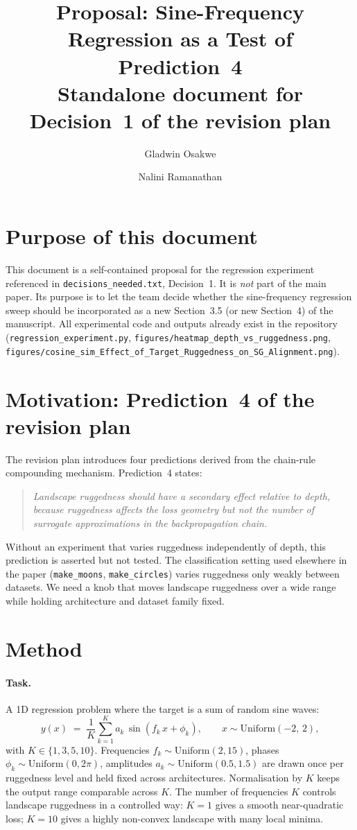 \documentclass[11pt]{article}
\title{Proposal: Sine-Frequency Regression as a Test of Prediction~4\\
{\large Standalone document for Decision~1 of the revision plan}}
\author{Gladwin Osakwe \and Nalini Ramanathan}
\date{}
\begin{document}
\maketitle

\section*{Purpose of this document}
This document is a self-contained proposal for the regression experiment
referenced in \texttt{decisions\_needed.txt}, Decision~1. It is \emph{not}
part of the main paper. Its purpose is to let the team decide whether the
sine-frequency regression sweep should be incorporated as a new
Section~3.5 (or new Section~4) of the manuscript. All experimental code
and outputs already exist in the repository
(\texttt{regression\_experiment.py},
\texttt{figures/heatmap\_depth\_vs\_ruggedness.png},
\texttt{figures/cosine\_sim\_Effect\_of\_Target\_Ruggedness\_on\_SG\_Alignment.png}).

\section{Motivation: Prediction~4 of the revision plan}
The revision plan introduces four predictions derived from the chain-rule
compounding mechanism. Prediction~4 states:
\begin{quote}
\itshape
Landscape ruggedness should have a secondary effect relative to depth,
because ruggedness affects the loss geometry but not the number of
surrogate approximations in the backpropagation chain.
\end{quote}
Without an experiment that varies ruggedness independently of depth, this
prediction is asserted but not tested. The classification setting used
elsewhere in the paper (\texttt{make\_moons}, \texttt{make\_circles})
varies ruggedness only weakly between datasets. We need a knob that
moves landscape ruggedness over a wide range while holding architecture
and dataset family fixed.

\section{Method}
\paragraph{Task.} A 1D regression problem where the target is a sum of
random sine waves:
\[
y(x) \;=\; \frac{1}{K}\sum_{k=1}^{K} a_k\,\sin(f_k\,x + \phi_k),\qquad
x \sim \mathrm{Uniform}(-2,\,2),
\]
with $K \in \{1,3,5,10\}$. Frequencies $f_k\sim\mathrm{Uniform}(2,15)$,
phases $\phi_k\sim\mathrm{Uniform}(0,2\pi)$, amplitudes
$a_k\sim\mathrm{Uniform}(0.5,1.5)$ are drawn once per ruggedness level
and held fixed across architectures. Normalisation by $K$ keeps the
output range comparable across $K$. The number of frequencies $K$
controls landscape ruggedness in a controlled way: $K=1$ gives a smooth
near-quadratic loss; $K=10$ gives a highly non-convex landscape with
many local minima.
\end{document}
